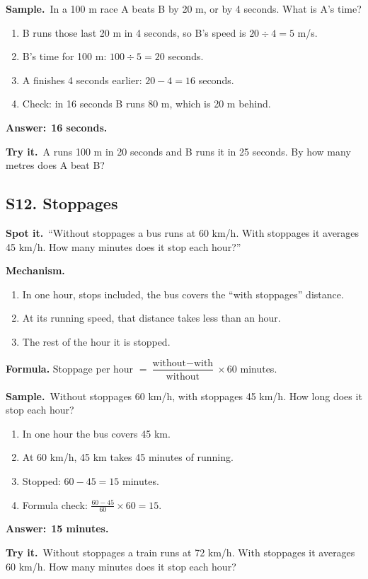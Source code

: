 \documentclass[11pt,a4paper]{article}
\let\oldsubsection\subsection
\renewcommand{\subsection}{\needspace{9\baselineskip}\oldsubsection}
\newcommand{\spot}{\textbf{\color{ember}Spot it.}\ }
\newcommand{\mech}{\textbf{\color{ember}Mechanism.}\ }
\newif\ifkeepsamp
\newcommand{\ans}[1]{\par\nopagebreak\noindent\textbf{\color{ember}Answer:}\ \textbf{#1}\par}
\newcommand{\samp}{\ifkeepsamp\needspace{4\baselineskip}\fi\textbf{\color{ember}Sample.}\ }
\newcommand{\tryit}[1]{\textbf{\color{ember}Try it.}\ #1}
\begin{document}
\samp In a 100 m race A beats B by 20 m, or by 4 seconds. What is A's time?
\begin{enumerate}
\item B runs those last 20 m in 4 seconds, so B's speed is $20 \div 4 = 5$ m/s.
\item B's time for 100 m: $100 \div 5 = 20$ seconds.
\item A finishes 4 seconds earlier: $20 - 4 = 16$ seconds.
\item Check: in 16 seconds B runs 80 m, which is 20 m behind.
\end{enumerate}
\ans{16 seconds.}

\tryit A runs 100 m in 20 seconds and B runs it in 25 seconds. By how many metres does A beat B?

\subsection{S12. Stoppages}
\spot ``Without stoppages a bus runs at 60 km/h. With stoppages it averages 45 km/h. How many minutes does it stop each hour?''

\mech
\begin{enumerate}
\item In one hour, stops included, the bus covers the ``with stoppages'' distance.
\item At its running speed, that distance takes less than an hour.
\item The rest of the hour it is stopped.
\end{enumerate}
\textbf{Formula.} Stoppage per hour $=\dfrac{\text{without}-\text{with}}{\text{without}}\times 60$ minutes.

\samp Without stoppages 60 km/h, with stoppages 45 km/h. How long does it stop each hour?
\begin{enumerate}
\item In one hour the bus covers 45 km.
\item At 60 km/h, 45 km takes 45 minutes of running.
\item Stopped: $60 - 45 = 15$ minutes.
\item Formula check: $\tfrac{60 - 45}{60} \times 60 = 15$.
\end{enumerate}
\ans{15 minutes.}

\tryit Without stoppages a train runs at 72 km/h. With stoppages it averages 60 km/h. How many minutes does it stop each hour?
\end{document}
